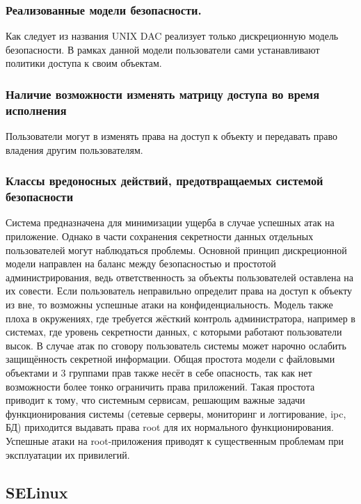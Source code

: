 \subsubsection {Реализованные модели безопасности.} 

Как следует из названия UNIX DAC реализует только дискреционную модель
безопасности. В рамках данной модели пользователи сами устанавливают
политики доступа к своим объектам.

\subsubsection{Наличие возможности изменять матрицу доступа 
	во время исполнения} 

Пользователи могут в изменять права на доступ к объекту и передавать
право владения другим пользователям.

\subsubsection{Классы вредоносных действий, предотвращаемых 
	системой безопасности} 

Система предназначена для минимизации ущерба в случае успешных атак на
приложение. Однако в части сохранения секретности данных отдельных
пользователей могут наблюдаться проблемы. Основной принцип дискреционной
модели направлен на баланс между безопасностью и простотой
администрирования, ведь ответственность за объекты пользователей
оставлена на их совести. Если пользователь неправильно определит права
на доступ к объекту из вне, то возможны успешные атаки на
конфиденциальность. Модель также плоха в окружениях, где требуется
жёсткий контроль администратора, например в системах, где уровень
секретности данных, с которыми работают пользователи высок. В случае
атак по сговору пользователь системы может нарочно ослабить защищённость
секретной информации. Общая простота модели с файловыми объектами и 3
группами прав также несёт в себе опасность, так как нет возможности
более тонко ограничить права приложений. Такая простота приводит к тому,
что системным сервисам, решающим важные задачи функционирования системы
(сетевые серверы, мониторинг и логгирование, ipc, БД) приходится выдавать
права root для их нормального функционирования. Успешные атаки на
root-приложения приводят к существенным проблемам при эксплуатации их
привилегий. 

\bigskip
\subsection{SELinux} 

